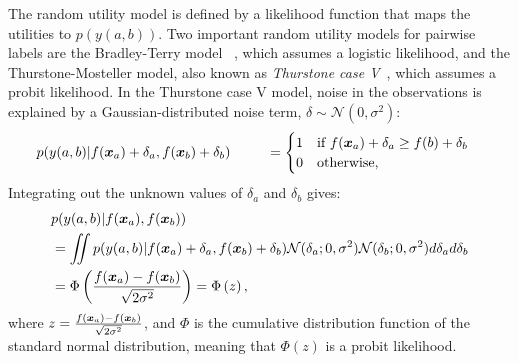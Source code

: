 The random utility model is defined by a likelihood function that
maps the utilities to $p(y(a,b))$.
Two important random utility models for pairwise labels are the Bradley-Terry model ~\citep{bradley1952rank,plackett1975analysis,luce1959possible},
which assumes a logistic likelihood,
and the Thurstone-Mosteller model, also known as \emph{Thurstone case V}~\citep{thurstone1927law,mosteller2006remarks}, which assumes a probit likelihood.
In the Thurstone case V model, 
noise in the observations is explained by a Gaussian-distributed noise term, $\delta \sim \mathcal{N}(0, \sigma^2)$:
\begin{align}
 p(y(a, b) | f(\boldsymbol x_a) + \delta_{a}, f(\boldsymbol x_b) + \delta_{b} )  
 \hspace{0.9cm} & = \begin{cases}
 1 & \text{if }f(\boldsymbol x_a) + \delta_{a} \geq f(b) + \delta_{b} \\
 0 & \text{otherwise,}
 \end{cases} &
 \label{eq:thurstone}
\end{align}
Integrating out the unknown values of $\delta_a$ and $\delta_b$ gives:
\begin{align}
& p( y(a, b) | f(\boldsymbol x_a), f(\boldsymbol x_b) )  \nonumber\\
& = \int\!\!\!\! \int p( y(a, b) | f(\boldsymbol x_a) + \delta_{a}, f(\boldsymbol x_b) + \delta_{b} ) \mathcal{N}(\delta_{a}; 0, \sigma^2)\mathcal{N}(\delta_{b}; 0, \sigma^2) d\delta_{a} d\delta_{b} \nonumber\\
& = \Phi\left(\frac{f(\boldsymbol x_a) - f(\boldsymbol x_b)}{\sqrt{2\sigma^2}}\right) = \Phi\left( z \right), 
\label{eq:plphi}
\end{align}
where $z = \frac{f(\boldsymbol x_a) - f(\boldsymbol x_b)}{\sqrt{2\sigma^2}}$,
and $\Phi$ is the cumulative distribution function of the standard normal distribution,
meaning that $\Phi(z)$ is a probit likelihood. 

